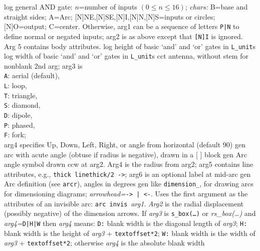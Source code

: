   {log}%
  {general AND gate: $n$=number of inputs $(0\leq n\leq 16)$;
           {\sl chars:}
           B=base and straight sides; A=Arc;
           [N]NE,[N]SE,[N]I,[N]N,[N]S=inputs or circles;
           [N]O=output; C=center.
   Otherwise, arg1 can be a sequence of letters {\tt P|N}
   to define normal or negated inputs; arg2 is as above except that
   {\tt [N]I} is ignored. Arg 5 contains body attributes.}%
%
  {log}%
  {height of basic `and' and `or' gates in {\tt L\_unit}s}%
%
  {log}%
  {width of basic `and' and `or' gates in {\tt L\_unit}s}%
%
  {cct}%
  {antenna, without stem for nonblank 2nd arg; arg3 is\\
    {\tt A}: aerial (default),\\
    {\tt L}: loop,\\
    {\tt T}: triangle,\\
    {\tt S}: diamond,\\
    {\tt D}: dipole,\\
    {\tt P}: phased,\\
    {\tt F}: fork;\\
    arg4 specifies Up, Down, Left, Right, or angle from horizontal (default 90) 
   }%
%
  {gen}%
  {arc with acute angle (obtuse if radius is negative), drawn in a [ ] block}%
%
  {gen}%
  {Arc angle symbol drawn ccw at arg2. Arg4 is the radius from arg2;
     arg5 contains line attributes, e.g., {\tt thick linethick/2 ->};
     arg6 is an optional label at mid-arc}%
%
  {gen}%
  {Arc definition (see {\tt arcr}), angles in degrees
    }%
%
  {gen}%
  {like {\tt dimension\_}, for drawing arcs for dimensioning diagrams;
      {\sl arrowhead=}{\tt -> | <-}. Uses the first argument as the attributes
      of an invisible arc: {\tt arc invis }{\sl arg1}.  {\sl Arg2} is the
      radial displacement (possibly negative) of the dimension arrows.
      If {\sl arg3} is {\tt s\_box(\ldots)} or {\sl rs\_box(\ldots)} and
      {\sl arg4=}{\tt D|H|W} then {\sl arg4} means:
      {\tt D:} blank width is the diagonal length of {\sl arg3};
      {\tt H:} blank width is the height of {\sl arg3} + {\tt textoffset*2};
      {\tt W:} blank width is the width of {\sl arg3} + {\tt textoffset*2};
      otherwise {\sl arg4} is the absolute blank width}%
